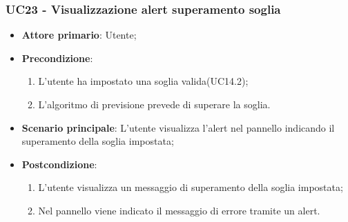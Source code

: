 \subsubsection{UC23 - Visualizzazione alert superamento soglia}
\label{sssec:uc23}
\begin{itemize}
  \item \textbf{Attore primario}: Utente;
  \item \textbf{Precondizione}:
  \begin{enumerate}
		\item L'utente ha impostato una soglia valida(UC14.2);
		\item L'algoritmo di previsione prevede di superare la soglia.
	\end{enumerate}
  \item \textbf{Scenario principale}:  L'utente visualizza l'alert nel pannello indicando il superamento della soglia impostata;
  \item \textbf{Postcondizione}:
  \begin{enumerate}
		\item L'utente visualizza un messaggio di superamento della soglia impostata;
		\item Nel pannello viene indicato il messaggio di errore tramite un alert.
	\end{enumerate}
\end{itemize}
